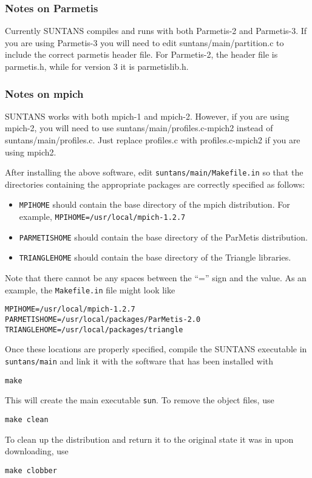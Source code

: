 \subsubsection{Notes on Parmetis}

Currently SUNTANS compiles and runs with both Parmetis-2
and Parmetis-3.  If you are using Parmetis-3 you will need to edit suntans/main/partition.c
to include the correct parmetis header file.  For Parmetis-2, the header file is parmetis.h,
while for version 3 it is parmetislib.h.

\subsubsection{Notes on mpich}

SUNTANS works with both mpich-1 and mpich-2. However, if you are using mpich-2, you will
need to use suntans/main/profiles.c-mpich2 instead of suntans/main/profiles.c.  Just replace
profiles.c with profiles.c-mpich2 if you are using mpich2.

\medskip

After installing the above software, edit \verb+suntans/main/Makefile.in+ 
so that the directories containing the appropriate packages
are correctly specified as follows:
\begin{itemize}
\item \verb+MPIHOME+ should contain the base directory of the mpich distribution.
For example, 
\verb+MPIHOME=/usr/local/mpich-1.2.7+
\item \verb+PARMETISHOME+ should contain the base directory of the ParMetis distribution.
\item \verb+TRIANGLEHOME+ should contain the base directory of the Triangle libraries.
\end{itemize}
Note that there cannot be any spaces between the ``='' sign and the value.  As an example,
the \verb+Makefile.in+ file might look like
\begin{verbatim}
MPIHOME=/usr/local/mpich-1.2.7
PARMETISHOME=/usr/local/packages/ParMetis-2.0
TRIANGLEHOME=/usr/local/packages/triangle
\end{verbatim}
Once these locations are properly specified, compile the SUNTANS executable in \verb+suntans/main+ and
link it with the software that has been installed with
\begin{verbatim}
make
\end{verbatim}
This will create the main executable \verb+sun+.  
To remove the object files, use
\begin{verbatim}
make clean
\end{verbatim}
To clean up the distribution and return it to the original state it was in upon downloading,
use
\begin{verbatim}
make clobber
\end{verbatim}

